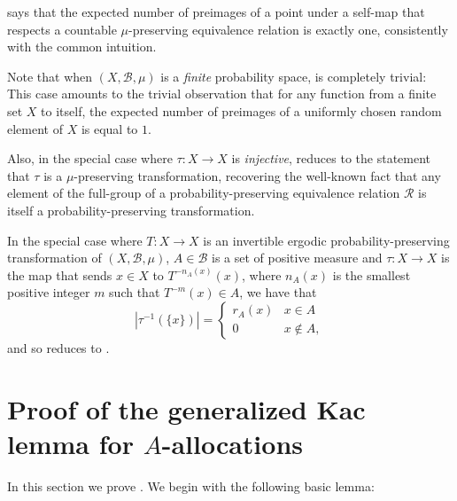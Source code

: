 \documentclass[12pt,reqno]{amsart}
\begin{document}
 says that the expected number of preimages of a point under a self-map that respects a countable $\mu$-preserving equivalence relation is exactly one,  consistently with the common intuition.

Note that when $(X,\mathcal{B},\mu)$ is a \emph{finite} probability space,   is  completely trivial: This case amounts to the trivial observation  that for any function from a finite set $X$ to itself, the expected number of preimages of a uniformly chosen random element of $X$ is equal to $1$.

Also, in the special case where $\tau:X \to X$ is \emph{injective},  reduces to the statement that $\tau$ is a $\mu$-preserving transformation, recovering the well-known fact that any element of the full-group of a probability-preserving equivalence relation $\mathcal{R}$ is itself a probability-preserving transformation.

In the special case where $T:X \to X$ is an invertible ergodic probability-preserving transformation of $(X,\mathcal{B},\mu)$, $A \in \mathcal{B}$ is a set of positive measure  and 
$\tau:X \to X$ is the map that sends $x \in X$ to $T^{-n_A(x)}(x)$, where $n_A(x)$ is the smallest positive integer $m$ such that $T^{-m}(x) \in A$, we have that 
\[
|\tau^{-1}(\{x\})| = \begin{cases}
    r_A(x) & x\in A\\
    0 & x \not \in A,
\end{cases}
\]
and so  reduces to .



\section{Proof of the generalized Kac lemma for $A$-allocations}
In this section we prove .
We begin with the following basic lemma:
\end{document}
